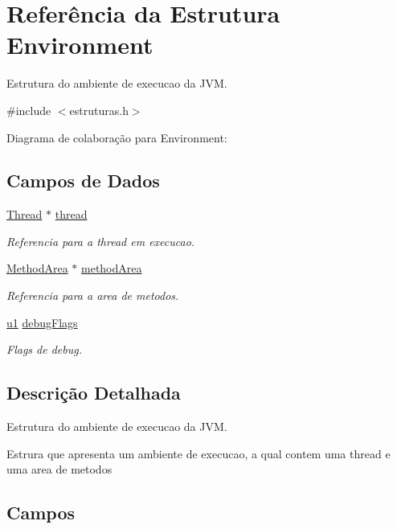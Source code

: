 \hypertarget{struct_environment}{}\section{Referência da Estrutura Environment}
\label{struct_environment}


Estrutura do ambiente de execucao da J\+VM.  




{\ttfamily \#include $<$estruturas.\+h$>$}



Diagrama de colaboração para Environment\+:
\subsection*{Campos de Dados}
\begin{DoxyCompactItemize}
\item 
\hyperlink{struct_thread}{Thread} $\ast$ \hyperlink{struct_environment_a9521ae1091a45875768bdbbe0a339014}{thread}
\begin{DoxyCompactList}\small\item\em Referencia para a thread em execucao. \end{DoxyCompactList}\item 
\hyperlink{struct_method_area}{Method\+Area} $\ast$ \hyperlink{struct_environment_a1c73c41c6c38e7e67ea22f6d59044852}{method\+Area}
\begin{DoxyCompactList}\small\item\em Referencia para a area de metodos. \end{DoxyCompactList}\item 
\hyperlink{estruturas_8h_a216a9f8b04b4f0af84a4ca9d1d85a6ca}{u1} \hyperlink{struct_environment_a8c0e2258ed60e94b0c7a66eac8e27e64}{debug\+Flags}
\begin{DoxyCompactList}\small\item\em Flags de debug. \end{DoxyCompactList}\end{DoxyCompactItemize}


\subsection{Descrição Detalhada}
Estrutura do ambiente de execucao da J\+VM. 

Estrura que apresenta um ambiente de execucao, a qual contem uma thread e uma area de metodos 

\subsection{Campos}
